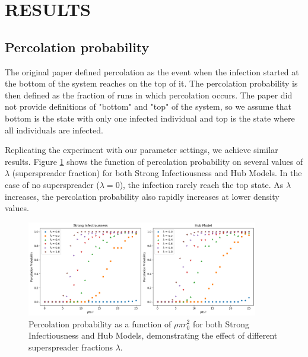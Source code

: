 \documentclass{article}
\begin{document}
\section{RESULTS}
\label{sec:results}
\subsection{Percolation probability}
\label{sec:results_percolation}
The original paper defined percolation as the event when the infection started at the bottom of the system reaches on the top of it. The percolation probability is then defined as the fraction of runs in which percolation occurs. The paper did not provide definitions of "bottom" and "top" of the system, so we assume that bottom is the state with only one infected individual and top is the state where all individuals are infected. 

Replicating the experiment with our parameter settings, we achieve similar results. Figure \ref{fig:percolation_probability} shows the function of percolation probability on several values of \(\lambda\) (superspreader fraction) for both Strong Infectiousness and Hub Models. In the case of no superspreader (\(\lambda = 0\)), the infection rarely reach the top state. As \(\lambda\) increases, the percolation probability also rapidly increases at lower density values.

\begin{figure}[!htbp]
    \centering
    \includegraphics[width=0.9\textwidth]{fig/percolation.png} 
    \caption{Percolation probability as a function of \(\rho\pi r_0^2\) for both Strong Infectiousness and Hub Models, demonstrating the effect of different superspreader fractions \(\lambda\).}
    \label{fig:percolation_probability}
\end{figure}
\end{document}
